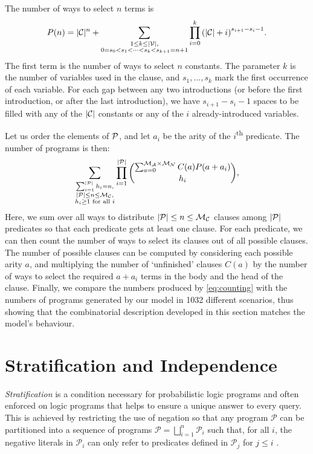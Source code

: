 The number of ways to select $n$ terms is
\[
  P(n) = |\mathcal{C}{}|^n + \sum_{\substack{1 \le k \le |\mathcal{V}{}|, \\ 0 = s_0 < s_1 < \cdots < s_k < s_{k+1} = n+1}} \prod_{i=0}^k {(|\mathcal{C}{}| + i)}^{s_{i+1} - s_i - 1}.
\]
The first term is the number of ways to select $n$ constants. The parameter $k$
is the number of variables used in the clause, and $s_1, \dots, s_k$ mark the
first occurrence of each variable. For each gap between any two introductions
(or before the first introduction, or after the last introduction), we have
$s_{i+1}-s_i-1$ spaces to be filled with any of the $|\mathcal{C}{}|$ constants
or any of the $i$ already-introduced variables.

Let us order the elements of $\mathcal{P}{}$, and let $a_i$ be the arity of the
$i$\textsuperscript{th} predicate. The number of programs is then:
\begin{equation} \label{eq:counting}
  \sum_{\substack{ \sum_{i=1}^{|\mathcal{P}{}|} h_i = n,\\
      |\mathcal{P}{}| \le n \le \mathcal{M}_{\mathcal{C}}{},\\
      h_i \ge 1 \text{ for all } i}} \prod_{i=1}^{|\mathcal{P}{}|}
  \binom{\sum_{a=0}^{\mathcal{M}_{\mathcal{A}}{} \times \mathcal{M}_{\mathcal{N}}{}} C(a) P(a+a_i)}{h_i},
\end{equation}
Here, we sum over all ways to distribute
$|\mathcal{P}{}| \le n \le \mathcal{M}_{\mathcal{C}}{}$ clauses among $|\mathcal{P}{}|$
predicates so that each predicate gets at least one clause. For each predicate,
we can then count the number of ways to select its clauses out of all possible
clauses. The number of possible clauses can be computed by considering each
possible arity $a$, and multiplying the number of `unfinished' clauses $C(a)$ by
the number of ways to select the required $a+a_i$ terms in the body and the head
of the clause. Finally, we compare the numbers produced by \cref{eq:counting}
with the numbers of programs generated by our model in \num{1032} different
scenarios, thus showing that the combinatorial description developed in this
section matches the model's behaviour.

\section{Stratification and Independence}\label{sec:independence}

\emph{Stratification} is a condition necessary for probabilistic logic programs
\citep{DBLP:conf/padl/MantadelisR17} and often enforced on logic programs
\citep{DBLP:journals/tcs/Bidoit91} that helps to ensure a unique answer to every
query. This is achieved by restricting the use of negation so that any program
$\mathscr{P}$ can be partitioned into a sequence of programs $\mathscr{P} =
\bigsqcup_{i=1}^n \mathscr{P}_i$ such that, for all $i$, the negative literals
in $\mathscr{P}_i$ can only refer to predicates defined in $\mathscr{P}_j$ for
$j \le i$ \citep{DBLP:journals/tcs/Bidoit91}.

